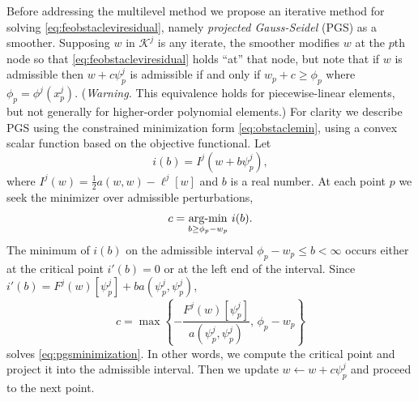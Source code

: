 \documentclass[letterpaper,final,12pt,reqno]{amsart}
\theoremstyle{claim}
\numberwithin{equation}{section}
\numberwithin{figure}{section}
\numberwithin{table}{section}
\numberwithin{theorem}{section}
\begin{document}
Before addressing the multilevel method we propose an iterative method for solving \eqref{eq:feobstacleviresidual}, namely \emph{projected Gauss-Seidel} (PGS) as a smoother.  Supposing $w$ in $\mathcal{K}^j$ is any iterate, the smoother modifies $w$ at the $p$th node so that \eqref{eq:feobstacleviresidual} holds ``at'' that node, but note that if $w$ is admissible then $w+c\psi_p^j$ is admissible if and only if $w_p + c \ge \phi_p$ where $\phi_p = \phi^j(x_p^j)$.  (\emph{Warning.}  This equivalence holds for piecewise-linear elements, but not generally for higher-order polynomial elements.)  For clarity we describe PGS using the constrained minimization form \eqref{eq:obstaclemin}, using a convex scalar function based on the objective functional.  Let
\begin{equation}
i(b) = I^j(w+b\psi_p^j),
\end{equation}
where $I^j(w) = \frac{1}{2} a(w,w) - \ell^j[w]$ and $b$ is a real number.  At each point $p$ we seek the minimizer over admissible perturbations,
\begin{equation}
  c = \mathop{\mathrm{arg\text{-}min}}_{b \ge \phi_p - w_p} \, i(b).  \label{eq:pgsminimization}
\end{equation}
The minimum of $i(b)$ on the admissible interval $\phi_p - w_p \le b < \infty$ occurs either at the critical point $i'(b)=0$ or at the left end of the interval.  Since $i'(b) = F^j(w)[\psi_p^j] + b a(\psi_p^j,\psi_p^j)$,
\begin{equation}
  c = \max\left\{-\frac{F^j(w)[\psi_p^j]}{a(\psi_p^j,\psi_p^j)}, \, \phi_p - w_p\right\}  \label{eq:pgsformula}
\end{equation}
solves \eqref{eq:pgsminimization}.  In other words, we compute the critical point and project it into the admissible interval.  Then we update $w \gets w + c\psi_p^j$ and proceed to the next point.
\end{document}
